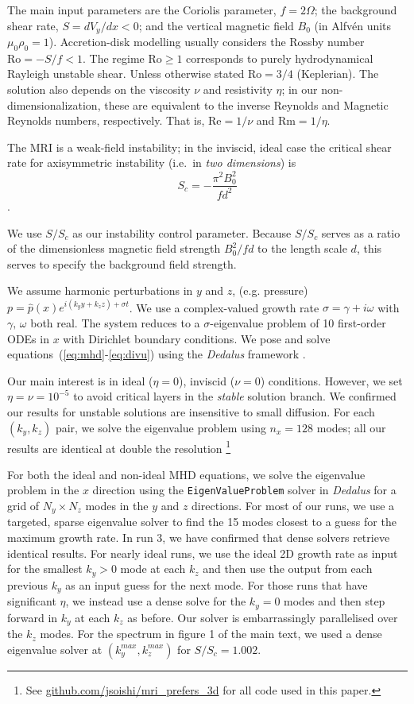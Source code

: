 \documentclass[openacc]{rsproca_new}%
\newcommand{\SSC}{S/S_{c}}
\newcommand{\Reyn}{\mathrm{Re}}
\newcommand{\Reym}{\mathrm{Rm}}
\newcommand{\Ro}{\mathrm{Ro}}
\begin{document}
The main input parameters are the Coriolis parameter, $f=2 \Omega$; the background shear rate, $S=dV_{y}/dx<0$; and the vertical magnetic field $B_{0}$ (in Alfv\'{e}n units $\mu_{0}\rho_{0}=1$).
Accretion-disk modelling usually considers the Rossby number $\Ro=-S/f<1$. 
The regime $\Ro\ge1$ corresponds to purely hydrodynamical Rayleigh unstable shear.
Unless otherwise stated $\Ro=3/4$ (Keplerian).
The solution also depends on the viscosity $\nu$ and resistivity $\eta$; in our non-dimensionalization, these are equivalent to the inverse Reynolds and Magnetic Reynolds numbers, respectively.
That is, $\Reyn = 1/\nu$ and $\Reym = 1/\eta$.

The MRI is a weak-field instability; in the inviscid, ideal case the critical shear rate for axisymmetric instability (i.e.\ in \emph{two dimensions}) is
\begin{equation}\label{eq:Sc}
  S_{c}=-\frac{\pi^{2}B_{0}^2}{fd^2}
\end{equation}
\cite{2015RSPSA.47140699V}.

We use $\SSC$ as our instability control parameter.
Because $\SSC$ serves as a ratio of the dimensionless magnetic field strength $B_0^2/f d$ to the length scale $d$, this serves to specify the background field strength.

We assume harmonic perturbations in $y$ and $z$, (e.g. pressure) $p=\hat{p}(x)e^{i(k_{y}y+k_{z}z)+\sigma{t}}$. 
We use a complex-valued growth rate $\sigma=\gamma+i\omega$ with $\gamma,\,\omega$ both real. 
The system reduces to a $\sigma$-eigenvalue problem of 10 first-order ODEs in $x$ with Dirichlet boundary conditions.
We pose and solve equations~(\ref{eq:mhd}-\ref{eq:divu}) using the \emph{Dedalus} framework \cite{2019arXiv190510388B}.

Our main interest is in ideal ($\eta=0$), inviscid ($\nu=0$) conditions.
However, we set $\eta=\nu=10^{-5}$ to avoid critical layers in the \textit{stable} solution branch.
We confirmed our results for unstable solutions are insensitive to small diffusion. 
For each $(k_{y},k_{z})$ pair, we solve the eigenvalue problem using $n_{x}=128$ modes; all our results are identical at double the resolution \footnote{See \protect\url{github.com/jsoishi/mri_prefers_3d} for all code used in this paper.}

For both the ideal and non-ideal MHD equations, we solve the eigenvalue problem in the $x$ direction using the \texttt{EigenValueProblem} solver in \emph{Dedalus} for a grid of $N_y \times N_z$ modes in the $y$ and $z$ directions.
For most of our runs, we use a targeted, sparse eigenvalue solver to find the 15 modes closest to a guess for the maximum growth rate.
In run 3, we have confirmed that dense solvers retrieve identical results.
For nearly ideal runs, we use the ideal 2D growth rate as input for the smallest $k_{y} > 0$ mode at each $k_{z}$ and then use the output from each previous $k_{y}$ as an input guess for the next mode.
For those runs that have significant $\eta$, we instead use a dense solve for the $k_{y} = 0$ modes and then step forward in $k_{y}$ at each $k_{z}$ as before.
Our solver is embarrassingly parallelised over the $k_{z}$ modes.
For the spectrum in figure 1 of the main text, we used a dense eigenvalue solver at $(k_{y}^{max},k_{z}^{max})$ for $\SSC= 1.002$.
\end{document}
